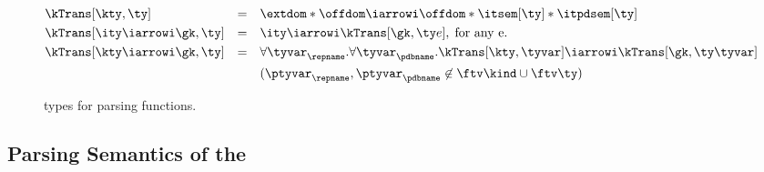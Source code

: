 \begin{figure}
\small
\fbox{$\kTrans[\gk,\ty] = \ity$} 
    
\begin{align*}
  &\kTrans[\kty,\ty] & = & \quad \extdom * \offdom \iarrowi \offdom * \itsem[\ty] * \itpdsem[\ty]
   \\
   &\kTrans[\ity \iarrowi \gk,\ty] & = & \quad \ity \iarrowi \kTrans[\gk,\ty e],
   \; \mbox{for any e}.
   \\
   &\kTrans[\kty \iarrowi \gk,\ty] & = & \quad 
      \forall\tyvar_\repname.\forall\tyvar_\pdbname.
         \kTrans[\kty,\tyvar] \iarrowi \kTrans[\gk,\ty \tyvar] \\
         & & & \quad (\ptyvar_\repname, \ptyvar_\pdbname \not \in \ftv \kind \cup
         \ftv \ty)
\end{align*}  
  \caption{\fomega types for parsing functions.}
  \label{fig:parser-types}
\end{figure}

\subsection{Parsing Semantics of the \ddc{}}
\label{sec:parse-sem}

